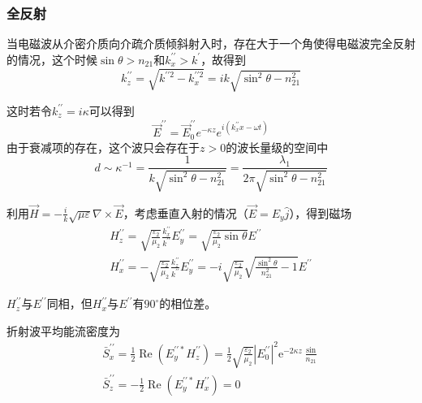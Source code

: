 \documentclass[UTF8]{ctexart}
\begin{document}
    \subsubsection{全反射}
    当电磁波从介密介质向介疏介质倾斜射入时，存在大于一个角使得电磁波完全反射的情况，这个时候$\sin \theta > n_{21}$和$k_x^{\prime \prime} > k^{\prime}$，故得到
    \begin{equation}
        k_z^{\prime \prime} = \sqrt{k^{\prime \prime 2} - k^{\prime \prime 2}_x} = ik \sqrt{\sin^2 \theta - n_{21}^2} 
    \end{equation}

\noindent 这时若令$k_z^{\prime \prime} = i \kappa$可以得到
\begin{equation}
    \vec{E}^{\prime \prime} = \vec{E}_0^{\prime \prime} e^{- \kappa z} e^{i(k^{\prime \prime}_x x - \omega t)}
\end{equation}
\noindent 由于衰减项的存在，这个波只会存在于$z>0$的波长量级的空间中
\begin{equation}
    d \sim \kappa^{-1} = \frac{1}{k \sqrt{\sin^2 \theta - n_{21}^2}} = \frac{\lambda_1}{2 \pi \sqrt{\sin^2 \theta - n_{21}^2}}
\end{equation}

    利用$\vec{H} = - \frac{i}{k} \sqrt{\mu \varepsilon} \nabla \times \vec{E}$，考虑垂直入射的情况（$\vec{E}= E_y \hat{j}$），得到磁场
    \begin{equation}
    \begin{array}{l}{H_{z}^{\prime \prime}=\sqrt{\frac{\varepsilon_{2}}{\mu_{2}}} \frac{k_{x}^{\prime \prime}}{k^{\prime \prime}} E_{y}^{\prime \prime}=\sqrt{\frac{\varepsilon_{2}}{\mu_{2}} \sin \theta} E^{\prime \prime}} \\ {H_{x}^{\prime \prime}=-\sqrt{\frac{\varepsilon_{2}}{\mu_{2}}} \frac{k_{z}^{\prime \prime}}{k^{\prime \prime}} E_{y}^{\prime \prime}=-i \sqrt{\frac{\varepsilon_{2}}{\mu_{2}}} \sqrt{\frac{\sin ^{2} \theta}{n_{21}^{2}}-1} E^{\prime \prime}}\end{array}
    \end{equation}

\noindent $H_z^{\prime \prime}$与$E^{\prime \prime}$同相，但$H_x^{\prime \prime }$与$E^{\prime \prime}$有$90^{\circ}$的相位差。

    折射波平均能流密度为
    \begin{equation}
    \begin{array}{l}{\bar{S}_{x}^{\prime \prime}=\frac{1}{2} \operatorname{Re}\left(E_{y}^{\prime \prime *} H_{z}^{\prime \prime}\right)=\frac{1}{2} \sqrt{\frac{\varepsilon_{2}}{\mu_{2}}}\left|E_{0}^{\prime \prime}\right|^{2} \mathrm{e}^{-2 \kappa z }}\frac{\sin}{n_{21}} \\ {\bar{S}_{z}^{\prime \prime}=-\frac{1}{2} \operatorname{Re}\left(E_{y}^{\prime \prime *} H_{x}^{\prime \prime}\right)=0}\end{array}
    \end{equation}
\end{document}
